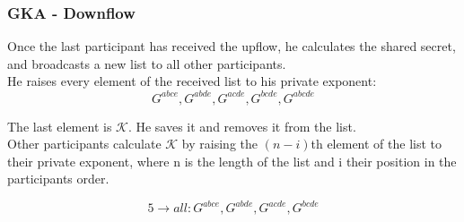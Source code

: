 \begin{frame}
  \frametitle{GKA - Downflow}
  Once the last participant has received the upflow, he calculates the shared secret, and broadcasts a new list to all other participants.\\[0.3cm]
  
  He raises every element of the  received list to his private exponent: 
  \[ G^{abce}, G^{abde}, G^{acde}, G^{bcde}, G^{abcde} \]
  
  The last element is $\mathcal{K}$. He saves it and removes it from the list.\\[0.3cm]
  
  Other participants calculate $\mathcal{K}$ by raising the $(n-i)$th element of the list to their private exponent, where n is the length of the list and i their position in the participants order.

  \begin{minipage}{.47\textwidth}
    \[ 5 \rightarrow all: G^{abce}, G^{abde}, G^{acde}, G^{bcde} \]

  \end{minipage}
  
  \begin{minipage}{.47\textwidth}
  \begin{figure}
    \end{figure}
  \end{minipage}
\end{frame}